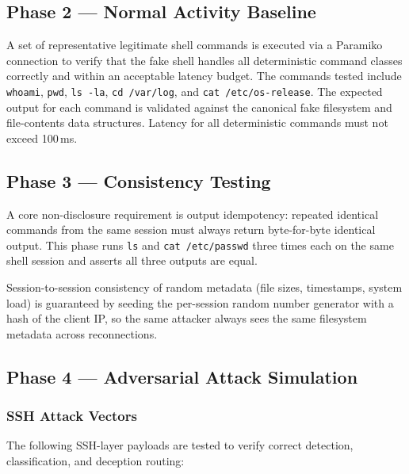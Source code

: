 \subsection{Phase 2 — Normal Activity Baseline}

A set of representative legitimate shell commands is executed via a Paramiko connection to verify that the fake shell handles all deterministic command classes correctly and within an acceptable latency budget. The commands tested include \texttt{whoami}, \texttt{pwd}, \texttt{ls -la}, \texttt{cd /var/log}, and \texttt{cat /etc/os-release}. The expected output for each command is validated against the canonical fake filesystem and file-contents data structures. Latency for all deterministic commands must not exceed 100\,ms.

\subsection{Phase 3 — Consistency Testing}

A core non-disclosure requirement is output idempotency: repeated identical commands from the same session must always return byte-for-byte identical output. This phase runs \texttt{ls} and \texttt{cat /etc/passwd} three times each on the same shell session and asserts all three outputs are equal.

Session-to-session consistency of random metadata (file sizes, timestamps, system load) is guaranteed by seeding the per-session random number generator with a hash of the client IP, so the same attacker always sees the same filesystem metadata across reconnections.

\subsection{Phase 4 — Adversarial Attack Simulation}

\subsubsection{SSH Attack Vectors}

The following \ac{SSH}-layer payloads are tested to verify correct detection, classification, and deception routing:

